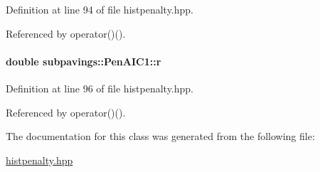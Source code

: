 \-Definition at line 94 of file histpenalty.\-hpp.



\-Referenced by operator()().

\hypertarget{classsubpavings_1_1PenAIC1_a669d71494e88f57e191d7b07f8dd53fa}{
\paragraph[{r}]{\setlength{\rightskip}{0pt plus 5cm}double {\bf subpavings\-::\-Pen\-A\-I\-C1\-::r}}}\label{classsubpavings_1_1PenAIC1_a669d71494e88f57e191d7b07f8dd53fa}


\-Definition at line 96 of file histpenalty.\-hpp.



\-Referenced by operator()().



\-The documentation for this class was generated from the following file\-:\begin{DoxyCompactItemize}
\item 
\hyperlink{histpenalty_8hpp}{histpenalty.\-hpp}\end{DoxyCompactItemize}
